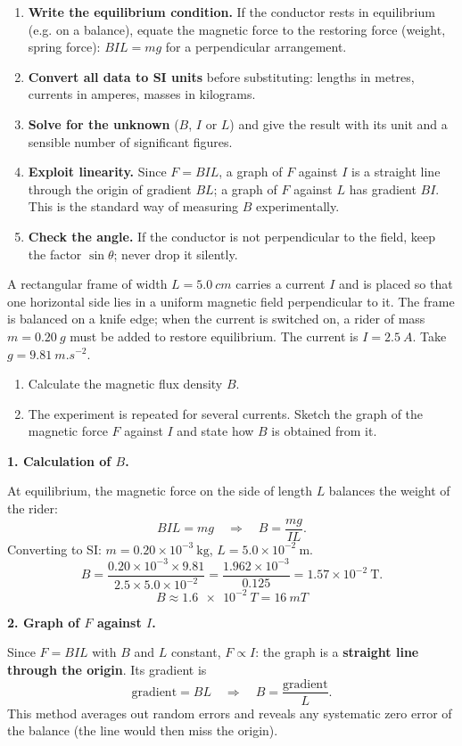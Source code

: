 \documentclass[11pt]{article}
\begin{document}
\begin{methode}[The current balance: $F=BIL\sin\theta$]
\begin{enumerate}
\item \textbf{Write the equilibrium condition.} If the conductor rests in equilibrium (e.g. on a balance), equate the magnetic force to the restoring force (weight, spring force): $BIL = mg$ for a perpendicular arrangement.
\item \textbf{Convert all data to SI units} before substituting: lengths in metres, currents in amperes, masses in kilograms.
\item \textbf{Solve for the unknown} ($B$, $I$ or $L$) and give the result with its unit and a sensible number of significant figures.
\item \textbf{Exploit linearity.} Since $F=BIL$, a graph of $F$ against $I$ is a straight line through the origin of gradient $BL$; a graph of $F$ against $L$ has gradient $BI$. This is the standard way of measuring $B$ experimentally.
\item \textbf{Check the angle.} If the conductor is not perpendicular to the field, keep the factor $\sin\theta$; never drop it silently.
\end{enumerate}
\end{methode}

\begin{exoresolu}
A rectangular frame of width $L=\SI{5.0}{cm}$ carries a current $I$ and is placed so that one horizontal side lies in a uniform magnetic field perpendicular to it. The frame is balanced on a knife edge; when the current is switched on, a rider of mass $m=\SI{0.20}{g}$ must be added to restore equilibrium. The current is $I=\SI{2.5}{A}$. Take $g=\SI{9.81}{m.s^{-2}}$.
\begin{enumerate}
\item Calculate the magnetic flux density $B$.
\item The experiment is repeated for several currents. Sketch the graph of the magnetic force $F$ against $I$ and state how $B$ is obtained from it.
\end{enumerate}
\tcblower
\textbf{1. Calculation of $B$.}

At equilibrium, the magnetic force on the side of length $L$ balances the weight of the rider:
\[ BIL = mg \quad\Longrightarrow\quad B=\frac{mg}{IL}. \]
Converting to SI: $m=0.20\times10^{-3}\ \mathrm{kg}$, $L=5.0\times10^{-2}\ \mathrm{m}$.
\[ B=\frac{0.20\times10^{-3}\times 9.81}{2.5\times 5.0\times10^{-2}}
=\frac{1.962\times10^{-3}}{0.125}
=1.57\times10^{-2}\ \mathrm{T}. \]
\[ \boxed{B\approx \SI{1.6e-2}{T} = \SI{16}{mT}} \]

\textbf{2. Graph of $F$ against $I$.}

Since $F=BIL$ with $B$ and $L$ constant, $F\propto I$: the graph is a \textbf{straight line through the origin}. Its gradient is
\[ \text{gradient}=BL \quad\Longrightarrow\quad B=\frac{\text{gradient}}{L}. \]
This method averages out random errors and reveals any systematic zero error of the balance (the line would then miss the origin).
\end{exoresolu}
\end{document}
